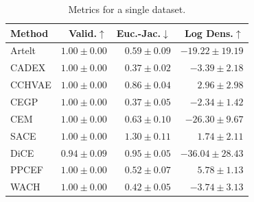 \begin{table}[ht]
\centering
\caption{Metrics for a single dataset.}
\label{tab:single_dataset_metrics}
\begin{center}
\begin{sc}
\begin{scriptsize}
\begin{tabular}{l|rrr}
\toprule
Method & Valid.$\uparrow$ & Euc.-Jac.$\downarrow$ & Log Dens.$\uparrow$ \\
\midrule
Artelt & $\boldsymbol{1.00\pm{0.00}}$ & $0.59\pm{0.09}$ & $-19.22\pm{19.19}$ \\
CADEX & $\boldsymbol{1.00\pm{0.00}}$ & $\boldsymbol{0.37\pm{0.02}}$ & $-3.39\pm{2.18}$ \\
CCHVAE & $\boldsymbol{1.00\pm{0.00}}$ & $0.86\pm{0.04}$ & $2.96\pm{2.98}$ \\
CEGP & $\boldsymbol{1.00\pm{0.00}}$ & $\boldsymbol{0.37\pm{0.05}}$ & $-2.34\pm{1.42}$ \\
CEM & $\boldsymbol{1.00\pm{0.00}}$ & $0.63\pm{0.10}$ & $-26.30\pm{9.67}$ \\
SACE & $\boldsymbol{1.00\pm{0.00}}$ & $1.30\pm{0.11}$ & $1.74\pm{2.11}$ \\
DiCE & $0.94\pm{0.09}$ & $0.95\pm{0.05}$ & $-36.04\pm{28.43}$ \\
PPCEF & $\boldsymbol{1.00\pm{0.00}}$ & $0.52\pm{0.07}$ & $\boldsymbol{5.78\pm{1.13}}$ \\
WACH & $\boldsymbol{1.00\pm{0.00}}$ & $0.42\pm{0.05}$ & $-3.74\pm{3.13}$ \\
\bottomrule
\end{tabular}
\end{scriptsize}
\end{sc}
\end{center}
\end{table}
